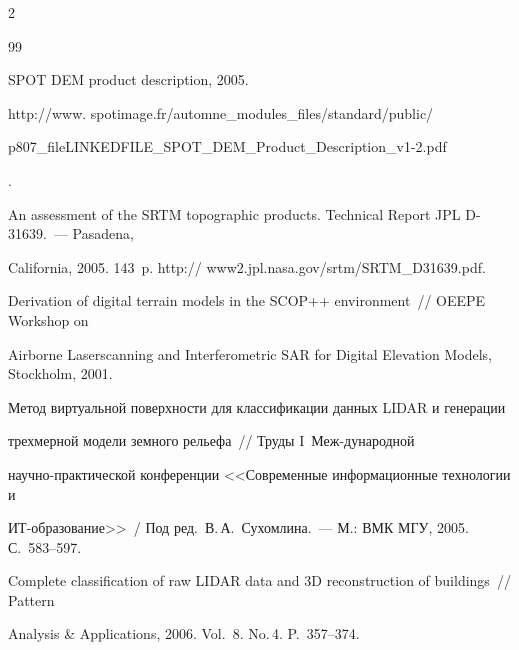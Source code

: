 \begin{multicols}{2}
{{\begin{thebibliography}{99}    


SPOT DEM product description, 2005. 

{\sf http://www. spotimage.fr/automne\_modules\_files/standard/public/\linebreak 

p807\_fileLINKEDFILE\_SPOT\_DEM\_Product\_Descrip\linebreak tion\_v1-2.pdf}.





An assessment of the SRTM topographic products. Technical Report JPL D-31639.~--- Pasadena, 

California, 2005. 143~p. {\sf http:// www2.jpl.nasa.gov/srtm/SRTM\_D31639.pdf}.





Derivation of digital terrain models in the SCOP++ environment~// OEEPE Workshop on 

Airborne Laserscanning and Interferometric SAR for Digital Elevation Models, Stockholm, 2001.





Метод виртуальной поверхности для классификации данных LIDAR и генерации 

трехмерной модели земного рельефа~// Труды I~Меж-\linebreak дународной 

научно-практической конференции <<Современные информационные технологии и 

ИТ-об\-ра\-зо\-вание>>~/ Под ред.\ В.\,А.~Сухомлина.~--- М.: ВМК МГУ, 2005. С.~583--597.





Complete classification of raw LIDAR data and 3D reconstruction of buildings~// Pattern 

Analysis \& Applications, 2006. Vol.~8. No.\,4. P.~357--374.




\end{thebibliography}}}
\end{multicols}
